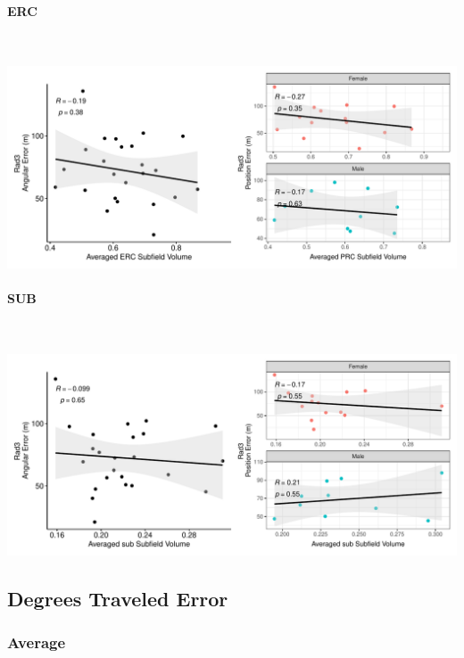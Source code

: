 \documentclass[
]{article}
\begin{document}
\paragraph{ERC}

~ \vspace{1cm}

\includegraphics{hippocampal_subfield_files/figure-latex/unnamed-chunk-13-1.pdf}

\newpage
\paragraph{SUB}

~ \vspace{1cm}

\includegraphics{hippocampal_subfield_files/figure-latex/unnamed-chunk-14-1.pdf}

\newpage

\subsection{Degrees Traveled Error}
\vspace{1cm}

\subsubsection{Average}
\end{document}
